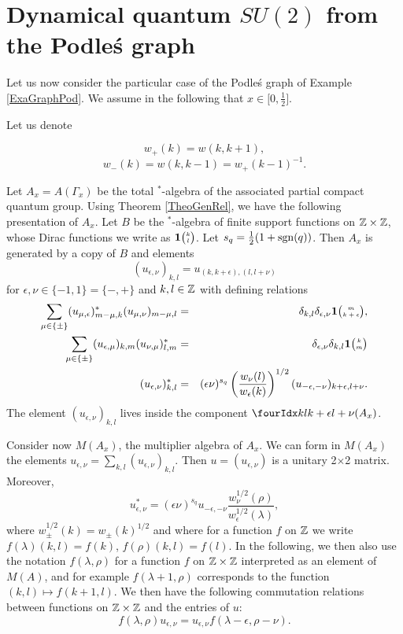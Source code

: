 
\section{Dynamical quantum $SU(2)$ from the Podle\'{s} graph}

Let us now consider the particular case of the Podle\'{s} graph of Example \ref{ExaGraphPod}. We assume in the following that $x\in \lbrack 0,\frac{1}{2}\rbrack$.

Let us denote

\[w_+(k) = w(k,k+1),\]\[w_-(k)  = w(k,k-1) = w_+(k-1)^{-1}.\] 

Let $A_x = A(\Gamma_x)$ be the total $^*$-algebra of the associated partial compact quantum group. Using Theorem \ref{TheoGenRel}, we have the following presentation of $A_x$. Let $B$ be the $^*$-algebra of finite support functions on $\mathbb{Z}\times \mathbb{Z}$, whose Dirac functions we write as $\mathbf{1}{\tiny {\begin{pmatrix} k\\l\end{pmatrix}}}$. Let $s_q = \frac{1}{2}(1+\operatorname{\mathrm{sgn}}(q))$. Then $A_x$ is generated by a copy of $B$ and elements \[(u_{\epsilon,\nu})_{k,l} = u_{(k,k+\epsilon),(l,l+\nu)}\] for $\epsilon,\nu\in \{-1,1\}=\{-,+\}$ and $k,l\in \mathbb{Z}$ with defining relations \begin{eqnarray*} \sum_{\mu\in \{\pm\}} (u_{\mu,\epsilon})_{m-\mu,k}^* (u_{\mu,\nu})_{m-\mu,l}&=& \delta_{k,l} \delta_{\epsilon,\nu} \mathbf{1}{\tiny {\begin{pmatrix} m\\k+\epsilon\end{pmatrix}}},\\ \sum_{\mu\in \{\pm\}} (u_{\epsilon,\mu})_{k,m} (u_{\nu,\mu})_{l,m}^* &=& \delta_{\epsilon,\nu}\delta_{k,l} \mathbf{1}{\tiny {\begin{pmatrix} k\\m\end{pmatrix}}}\\ (u_{\epsilon,\nu})_{k,l}^* &=& (\epsilon\nu)^{s_q} \left(\frac{w_{\nu}(l)}{w_{\epsilon}(k)}\right)^{1/2} (u_{-\epsilon,-\nu})_{k+\epsilon,l+\nu}.\end{eqnarray*} The element $(u_{\epsilon,\nu})_{k,l}$ lives inside the component $\Gr{(A_x)}{k}{k+\epsilon}{l}{l+\nu}$.

Consider now $M(A_x)$, the multiplier algebra of $A_x$. We can form in $M(A_x)$ the elements $u_{\epsilon,\nu} = \sum_{k,l} (u_{\epsilon,\nu})_{k,l}$. Then $u=(u_{\epsilon,\nu})$ is a unitary 2$\times$2 matrix. Moreover, \begin{equation}\label{EqAdju}u_{\epsilon,\nu}^* = (\epsilon\nu)^{s_q} u_{-\epsilon,-\nu}\frac{w_{\nu}^{1/2}(\rho)}{w_{\epsilon}^{1/2}(\lambda)} ,\end{equation} where $w_{\pm}^{1/2}(k) = w_{\pm}(k)^{1/2}$ and where for a function $f$ on $\mathbb{Z}$ we write $f(\lambda)(k,l) = f(k)$, $f(\rho)(k,l) = f(l)$. In the following, we then also use the notation $f(\lambda,\rho)$ for a function $f$ on $\mathbb{Z}\times \mathbb{Z}$ interpreted as an element of $M(A)$, and for example $f(\lambda+1,\rho)$ corresponds to the function $(k,l)\mapsto f(k+1,l)$. We then have the following commutation relations between functions on $\mathbb{Z}\times \mathbb{Z}$ and the entries of $u$: \begin{equation}\label{EqGradu} f(\lambda,\rho)u_{\epsilon,\nu} = u_{\epsilon,\nu}f(\lambda-\epsilon,\rho-\nu).\end{equation}

